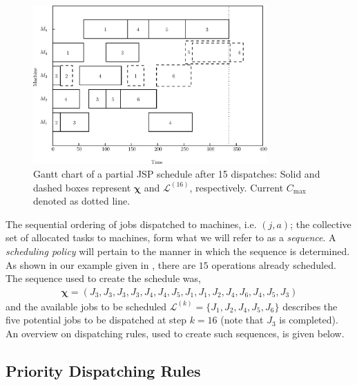 \documentclass[smallextended]{svjour3}
\renewcommand{\vchi}{\bm \chi}
\begin{document}
\begin{figure}[t!]\centering
  \includegraphics[width=0.8\textwidth]{figures/jssp_example_nocolor.eps}
  \caption[Gantt chart of a partial JSP schedule]{Gantt chart of a
    partial JSP schedule after 15 dispatches: Solid and dashed boxes
    represent $\vchi$ and $\mathcal{L}^{(16)}$, respectively. Current
    $C_{\max}$ denoted as dotted line.}
  \label{fig:jssp:example}
\end{figure}

The sequential ordering of jobs dispatched to machines, i.e. $(j,a)$; the 
collective set of allocated tasks to machines, form what we will refer to as a 
\emph{sequence}. A \emph{scheduling policy} will pertain to the manner in which 
the sequence is determined.  As shown in our example given in 
, there are $15$ operations already scheduled. The 
sequence used to create the schedule was,
\begin{eqnarray}
  \vchi=\left(J_3,J_3,J_3,J_3,J_4,J_4,J_5,J_1,J_1,J_2,J_4,J_6,J_4,J_5,J_3\right)
\end{eqnarray}
and the available jobs to be scheduled
$\mathcal{L}^{(k)}=\{J_1,J_2,J_4,J_5,J_6\}$ describes the five potential jobs 
to be dispatched at step $k=16$ (note that $J_3$ is completed). An overview on 
dispatching rules, used to create such sequences, is given below.

\subsection{Priority Dispatching Rules}
\end{document}
